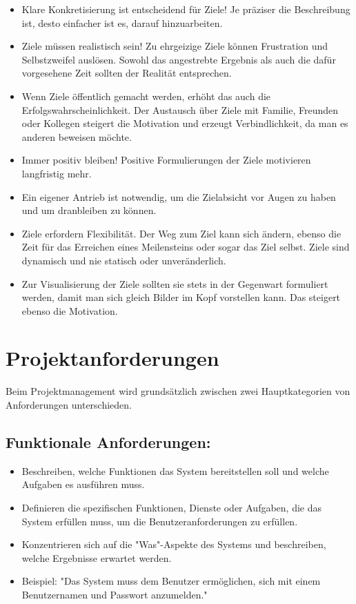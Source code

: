 \begin{itemize}
    \item Klare Konkretisierung ist entscheidend für Ziele! Je präziser die Beschreibung ist, desto einfacher
          ist es, darauf hinzuarbeiten.
    \item Ziele müssen realistisch sein! Zu ehrgeizige Ziele können Frustration und Selbstzweifel
          auslösen. Sowohl das angestrebte Ergebnis als auch die dafür vorgesehene Zeit sollten der Realität
          entsprechen.
    \item Wenn Ziele öffentlich gemacht werden, erhöht das auch die Erfolgswahrscheinlichkeit. Der Austausch
          über Ziele mit Familie, Freunden oder Kollegen steigert die Motivation und erzeugt Verbindlichkeit, da
          man es anderen beweisen möchte.
    \item Immer positiv bleiben! Positive Formulierungen der Ziele motivieren langfristig mehr.
    \item Ein eigener Antrieb ist notwendig, um die Zielabsicht vor Augen zu haben und um dranbleiben zu
          können.
    \item Ziele erfordern Flexibilität. Der Weg zum Ziel kann sich ändern, ebenso die Zeit für das Erreichen
          eines Meilensteins oder sogar das Ziel selbst. Ziele sind dynamisch und nie statisch oder unveränderlich.
    \item Zur Visualisierung der Ziele sollten sie stets in der Gegenwart formuliert werden, damit man sich
          gleich Bilder im Kopf vorstellen kann. Das steigert ebenso die Motivation.
\end{itemize}

\section{Projektanforderungen}

Beim Projektmanagement wird grundsätzlich zwischen zwei Hauptkategorien von Anforderungen unterschieden.

\subsection{Funktionale Anforderungen:}
\begin{itemize}
  \item Beschreiben, welche Funktionen das System bereitstellen soll und welche Aufgaben es ausführen muss.
  \item Definieren die spezifischen Funktionen, Dienste oder Aufgaben, die das System erfüllen muss, um die Benutzeranforderungen zu erfüllen.
  \item Konzentrieren sich auf die "Was"-Aspekte des Systems und beschreiben, welche Ergebnisse erwartet werden.
  \item Beispiel: "Das System muss dem Benutzer ermöglichen, sich mit einem Benutzernamen und Passwort anzumelden."
\end{itemize}

